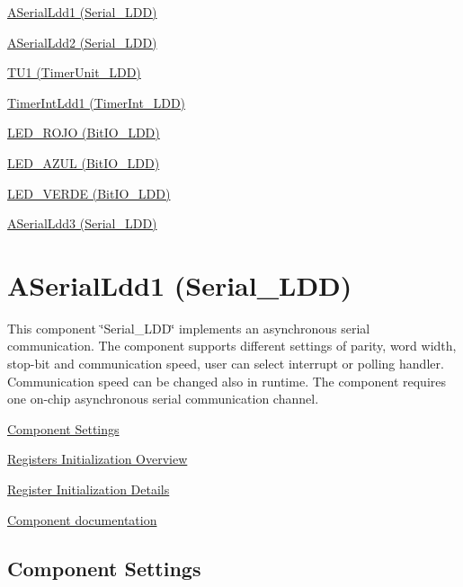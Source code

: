 
\begin{DoxyItemize}
\item \hyperlink{ASerialLdd1}{A\+Serial\+Ldd1 (Serial\+\_\+\+L\+DD)}
\item \hyperlink{ASerialLdd2}{A\+Serial\+Ldd2 (Serial\+\_\+\+L\+DD)}
\item \hyperlink{TU1}{T\+U1 (Timer\+Unit\+\_\+\+L\+DD)}
\item \hyperlink{TimerIntLdd1}{Timer\+Int\+Ldd1 (Timer\+Int\+\_\+\+L\+DD)}
\item \hyperlink{LED_ROJO}{L\+E\+D\+\_\+\+R\+O\+JO (Bit\+I\+O\+\_\+\+L\+DD)}
\item \hyperlink{LED_AZUL}{L\+E\+D\+\_\+\+A\+Z\+UL (Bit\+I\+O\+\_\+\+L\+DD)}
\item \hyperlink{LED_VERDE}{L\+E\+D\+\_\+\+V\+E\+R\+DE (Bit\+I\+O\+\_\+\+L\+DD)}
\item \hyperlink{ASerialLdd3}{A\+Serial\+Ldd3 (Serial\+\_\+\+L\+DD)} 
\end{DoxyItemize}\hypertarget{ASerialLdd1}{}\section{A\+Serial\+Ldd1 (Serial\+\_\+\+L\+DD)}\label{ASerialLdd1}
This component \char`\"{}\+Serial\+\_\+\+L\+D\+D\char`\"{} implements an asynchronous serial communication. The component supports different settings of parity, word width, stop-\/bit and communication speed, user can select interrupt or polling handler. Communication speed can be changed also in runtime. The component requires one on-\/chip asynchronous serial communication channel.


\begin{DoxyItemize}
\item \hyperlink{ASerialLdd1_settings}{Component Settings}
\item \hyperlink{ASerialLdd1_regs_overview}{Registers Initialization Overview}
\item \hyperlink{ASerialLdd1_regs_details}{Register Initialization Details}
\item \hyperlink{group___a_serial_ldd1__module}{Component documentation} 
\end{DoxyItemize}\hypertarget{ASerialLdd1_settings}{}\subsection{Component Settings}\label{ASerialLdd1_settings}


